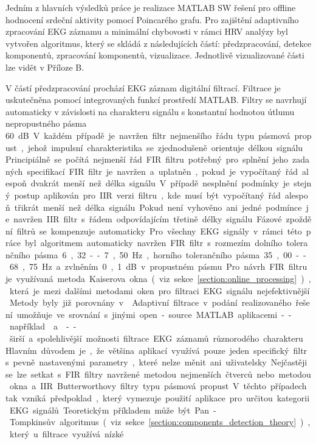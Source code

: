 Jedním z hlavních výsledků práce je realizace MATLAB SW řešení pro offline
hodnocení srdeční aktivity pomocí Poincarého grafu. Pro zajištění adaptivního
zpracování EKG záznamu a minimální chybovosti v rámci HRV analýzy byl vytvořen
algoritmus, který se skládá z následujících částí: předzpracování, detekce
komponentů, zpracování komponentů, vizualizace. Jednotlivě vizualizované části
lze vidět v Příloze B.

V částí předzpracování prochází EKG záznam digitální filtrací. Filtrace je
uskutečněna pomocí integrovaných funkcí prostředí MATLAB. Filtry se
navrhují automaticky v závislosti na charakteru signálu s konstantní hodnotou
útlumu nepropustného pásma 60~\si\dB. V každém případě je navržen filtr
nejmenšího řádu typu pásmová propust, jehož impulsní charakteristika se
zjednodušeně orientuje délkou signálu. Principiálně se počítá nejmenší řád FIR
filtru potřebný pro splnění jeho zadaných specifikací. FIR filtr je navržen a
uplatněn, pokud je vypočítaný řád alespoň dvakrát menší než délka signálu. V
případě nesplnění podmínky je stejný postup aplikován pro IIR verzi filtru, kde
musí být vypočítaný řád alespoň třikrát menší než délka signálu. Pokud není
vyhověno ani jedné podmínce je navržen IIR filtr s řádem odpovídajícím třetině
délky signálu. Fázové zpoždění filtrů se kompenzuje automaticky. Pro všechny EKG
signály v rámci této práce byl algoritmem automaticky navržen FIR filtr s
rozmezím dolního tolerančního pásma 6,32--7,50~\si\Hz, horního tolerančního
pásma 35,00--68,75~\si\Hz~a zvlněním 0,1~\si\dB~v propustném pásmu. Pro návrh
FIR filtru je využívaná metoda Kaiserova okna (viz
sekce~\ref{section:online_processing}), která je mezi dalšími metodami oken pro
filtraci EKG signálu nejefektivnější. Metody byly již porovnány v
\cite{Kumar2014,Lakhwani2013,Yadav2011}. Adaptivní filtrace v podání
realizovaného řešení umožňuje ve srovnání s jinými open-source MATLAB
aplikacemi -- například~\cite{ecgkit}~a~\cite{Sedghamiz2018} -- širší a
spolehlivější možnosti filtrace EKG záznamů různorodého charakteru. Hlavním
důvodem je, že většina aplikací využívá pouze jeden specifický filtr s pevně
nastavenými parametry, které nelze měnit ani uživatelsky. Nejčastěji se lze
setkat s FIR filtry navržené metodou nejmenších čtverců nebo metodou okna a IIR
Butterworthovy filtry typu pásmová propust. V těchto případech tak vzniká
předpoklad, který vymezuje použití aplikace pro určitou kategorii EKG signálů.
Teoretickým příkladem může být Pan-Tompkinsův algoritmus (viz
sekce~\ref{section:components_detection_theory}), který u filtrace využívá nízké
